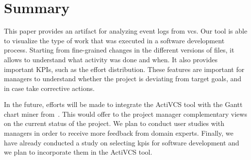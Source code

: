 \section{Summary}
\label{sec:conclusion}

This paper provides an artifact for analyzing event logs from \gls{vcs}. Our tool is able to visualize the type of work that was executed in a software development process. Starting from fine-grained changes in the different versions of files, it allows to understand what activity was done and when. It also provides important KPIs, such as the effort distribution. These features are important for managers to understand whether the project is deviating from target goals, and in case take corrective actions.

In the future, efforts will be made to integrate the ActiVCS tool with the Gantt chart miner from~\cite{DBLP:conf/bpm/BalaCMRP}. This would offer to the project manager complementary views on the current status of the project. We plan to conduct user studies with managers in order to receive more feedback from domain experts. Finally, we have already conducted a study on selecting \glspl{kpi} for software development and we plan  to incorporate them in the ActiVCS tool.
